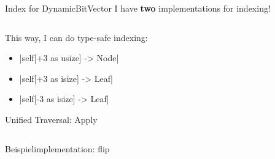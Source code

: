 \begin{frame}[c]{Index for DynamicBitVector}
    \large
    I have \textbf{two} implementations for indexing!
    \inputminted[linenos=true]{rust}{code/indexing.rs}
    \vspace{2em}
    This way, I can do type-safe indexing:
    \begin{itemize}
        \item {}|self[+3 as usize] -> Node|
        \item {}|self[+3 as isize] -> Leaf|
        \item {}|self[-3 as isize] -> Leaf|
    \end{itemize}
\end{frame}


\begin{frame}[c]{Unified Traversal: Apply} 
    \inputminted[linenos=true,fontsize=\footnotesize]{rust}{code/apply.rs}
\end{frame}

\begin{frame}[c]{Beispielimplementation: flip}
    \inputminted[linenos=true]{rust}{code/flip.rs}
\end{frame}
